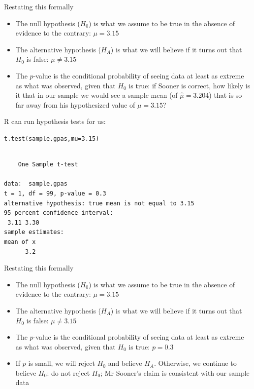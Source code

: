\documentclass{beamer}\usepackage[]{graphicx}\usepackage[]{color}
\makeatletter
\newcommand{\hlnum}[1]{\textcolor[rgb]{0.824,0.412,0.118}{#1}}%
\newcommand{\hlstd}[1]{\textcolor[rgb]{1,0.894,0.769}{#1}}%
\newcommand{\hlkwc}[1]{\textcolor[rgb]{0.78,0.941,0.545}{#1}}%
\newcommand{\hlkwd}[1]{\textcolor[rgb]{1,0.78,0.769}{#1}}%
\newenvironment{kframe}{%
 \def\at@end@of@kframe{}%
 \ifinner\ifhmode%
  \def\at@end@of@kframe{\end{minipage}}%
  \begin{minipage}{\columnwidth}%
 \fi\fi%
 \def\FrameCommand##1{\hskip\@totalleftmargin \hskip-\fboxsep
 \colorbox{shadecolor}{##1}\hskip-\fboxsep
     \hskip-\linewidth \hskip-\@totalleftmargin \hskip\columnwidth}%
 \MakeFramed {\advance\hsize-\width
   \@totalleftmargin\z@ \linewidth\hsize
   \@setminipage}}%
 {\par\unskip\endMakeFramed%
 \at@end@of@kframe}
\newenvironment{knitrout}{}{} %
\makeatother
\begin{document}
\begin{darkframes}
    \begin{frame}{Restating this formally}
      \begin{itemize}[<+->]
        \item The \alert{null hypothesis} ($H_0$) is what we assume to be true in the absence of evidence to the contrary: \alert{$\mu=3.15$}
        \item The \alert{alternative hypothesis} ($H_A$) is what we will believe if it turns out that $H_0$ is false: \alert{$\mu\neq 3.15$}
        \item The $p$-value is the conditional probability of seeing data at least as extreme as what was observed, given that $H_0$ is true: \alert{if Sooner is correct, how likely is it that in our sample we would see a sample mean (of $\hat\mu=3.204$) that is so far away from his hypothesized value of $\mu=3.15$?}
      \end{itemize}
    \end{frame}
      
    
      
    \begin{frame}[fragile]
      R can run hypothesis tests for us:
\begin{knitrout}
\color{fgcolor}\begin{kframe}
\begin{alltt}
\hlkwd{t.test}\hlstd{(sample.gpas,} \hlkwc{mu}\hlstd{=}\hlnum{3.15}\hlstd{)}
\end{alltt}
\begin{verbatim}

	One Sample t-test

data:  sample.gpas
t = 1, df = 99, p-value = 0.3
alternative hypothesis: true mean is not equal to 3.15
95 percent confidence interval:
 3.11 3.30
sample estimates:
mean of x 
      3.2 
\end{verbatim}
\end{kframe}
\end{knitrout}
    \end{frame}

    \begin{frame}{Restating this formally}
      \begin{itemize}
        \item The \alert{null hypothesis} ($H_0$) is what we assume to be true in the absence of evidence to the contrary: \alert{$\mu=3.15$}
        \item The \alert{alternative hypothesis} ($H_A$) is what we will believe if it turns out that $H_0$ is false: \alert{$\mu\neq 3.15$}
        \item The $p$-value is the conditional probability of seeing data at least as extreme as what was observed, given that $H_0$ is true: \alert{$p=0.3$}
        \item If $p$ is small, we will reject $H_0$ and believe $H_A$. Otherwise, we continue to believe $H_0$: \alert{do not reject $H_0$; Mr Sooner's claim is consistent with our sample data}
      \end{itemize}
    \end{frame}
      

\end{darkframes}
\end{document}
